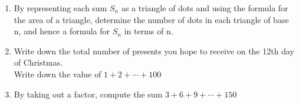 \documentclass{article}
\begin{document}
\begin{enumerate}
\begin{enumerate}
		\item By representing each sum $S_n$ as a triangle of dots and using the formula for the area of a triangle, determine the number of dots in each triangle of base n, and hence a formula for $S_n$ in terms of n.
		
		\item Write down the total number of presents you hope to receive on the 12th day of Christmas. \\
				Write down the value of $1 + 2 + \cdots + 100$
		\item By taking out a factor, compute the sum $3 + 6 + 9 + \cdots + 150$	
	\end{enumerate}
	
\end{enumerate}
\end{document}
